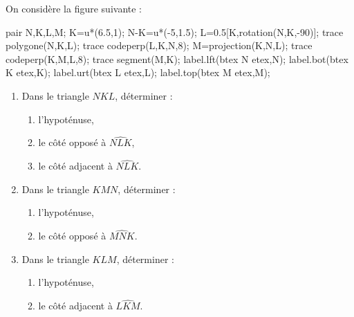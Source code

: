 \begin{exercice*}
    On considère la figure suivante :

    \begin{Geometrie}[CoinHD={(7.5u,4.5u)}]        
        pair N,K,L,M;
        K=u*(6.5,1);
        N-K=u*(-5,1.5);
        L=0.5[K,rotation(N,K,-90)];
        trace polygone(N,K,L);            
        trace codeperp(L,K,N,8);
        M=projection(K,N,L);
        trace codeperp(K,M,L,8);
        trace segment(M,K);
        label.lft(btex N etex,N);
        label.bot(btex  K etex,K);
        label.urt(btex L etex,L);
        label.top(btex M etex,M);
    \end{Geometrie}
    \begin{enumerate}
        \item Dans le triangle $NKL$, déterminer :
        \begin{enumerate}
            \item l'hypoténuse,
            \item le côté opposé à $\widehat{NLK}$,
            \item le côté adjacent à $\widehat{NLK}$.
        \end{enumerate}
        \item Dans le triangle $KMN$, déterminer :
        \begin{enumerate}
            \item l'hypoténuse,
            \item le côté opposé à $\widehat{MNK}$.            
        \end{enumerate} 
        \item Dans le triangle $KLM$, déterminer :
        \begin{enumerate}
            \item l'hypoténuse,            
            \item le côté adjacent à $\widehat{LKM}$.
        \end{enumerate}             
    \end{enumerate}
\end{exercice*}
